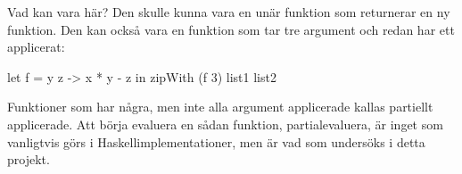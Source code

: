 \documentclass[Rapport]{subfiles}
\begin{document}
Vad kan  vara här? Den skulle kunna vara en unär funktion som returnerar en ny
funktion. Den kan också vara en funktion som tar tre argument och redan har ett
applicerat:

\begin{codeEx}
let f = \x y z -> x * y - z
in  zipWith (f 3) list1 list2
\end{codeEx}


Funktioner som har några, men inte alla argument applicerade kallas 
partiellt applicerade. Att börja evaluera en sådan funktion, partialevaluera,
är inget som vanligtvis görs i Haskellimplementationer, 
men är vad som undersöks i detta projekt. 
\end{document}
